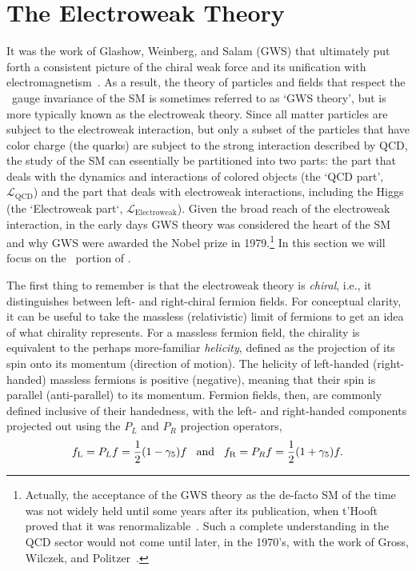 \section{The Electroweak Theory}
\label{sec:ewk_description}

It was the work of Glashow, Weinberg, and Salam (GWS) that ultimately put forth a
consistent picture of the chiral weak force and
its unification with electromagnetism~\cite{Glashow:1961tr,Weinberg:1967tq,Salam:1968rm}.
As a result, the theory of particles and fields that respect the \SUewk~gauge
invariance of the SM is sometimes referred to as `GWS theory', 
but is more typically known as the electroweak theory. Since all matter particles
are subject to the electroweak interaction, but only a subset of the particles  that
have color charge (the quarks) are subject to the strong interaction described by QCD, the study of the SM can essentially
be partitioned into two parts: the part that deals with the dynamics and interactions of
colored objects (the `QCD part', $\mathcal{L}_{\text{QCD}}$) and the part that deals with electroweak
interactions, including the Higgs (the `Electroweak part`, $\mathcal{L}_{\text{Electroweak}}$).
Given the broad reach of the electroweak interaction,
in the early days GWS theory was considered the heart of the SM and why
GWS were awarded the Nobel prize in 1979.\footnote{Actually, the acceptance of the GWS theory as the
de-facto SM of the time was not widely held until some years after its publication, when t'Hooft
proved that it was renormalizable~\cite{tHooft:1971akt,tHooft:1971qjg}.
Such a complete understanding in the QCD sector would not come until later, in the
1970's, with the work of Gross, Wilczek, and Politzer~\cite{GrossWilczek,Politzer}.}
In this section we will focus on the \SUewk~portion of \SML.

The first thing to remember is that the electroweak theory is \textit{chiral}, i.e., it distinguishes
between left- and right-chiral fermion fields.
For conceptual clarity, it can be useful to take the massless (relativistic) limit of fermions to
get an idea of what chirality represents.
For a massless fermion field, the chirality is equivalent to the perhaps more-familiar \textit{helicity},
defined as the projection of its spin onto its momentum (direction of motion).
The helicity of left-handed (right-handed) massless fermions is positive (negative), meaning
that their spin is parallel (anti-parallel) to its momentum.
Fermion fields, then, are commonly defined inclusive of their handedness, with the left-
and right-handed components projected out using the $P_L$ and $P_R$ projection operators,
\begin{equation}
	f_{\text{L}} = P_L f = \frac{1}{2}(1- \gamma_5)f \hspace{0.3cm}\text{and}\hspace{0.3cm} f_{\text{R}} = P_R f = \frac{1}{2}(1+\gamma_5)f.
	\label{eq:chiral_projection}
\end{equation}

